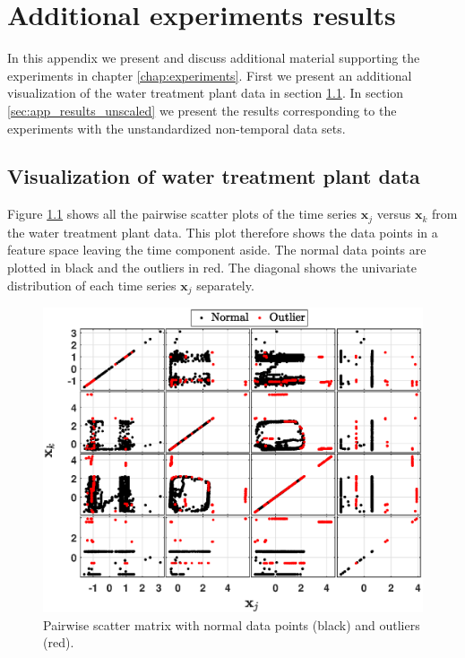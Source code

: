 \chapter{Additional experiments results}
\label{app:experiments}

In this appendix we present and discuss additional material supporting the experiments in chapter \ref{chap:experiments}. First we present an additional visualization of the water treatment plant data in section \ref{sec:app_visualization}. In section \ref{sec:app_results_unscaled} we present the results corresponding to the experiments with the unstandardized non-temporal data sets.

\section{Visualization of water treatment plant data}
\label{sec:app_visualization}

Figure \ref{fig:experiments_swat_scatter} shows all the pairwise scatter plots of the time series $\mathbf{x}_j$ versus $\mathbf{x}_k$ from the water treatment plant data. This plot therefore shows the data points in a feature space leaving the time component aside. The normal data points are plotted in black and the outliers in red. The diagonal shows the univariate distribution of each time series $\mathbf{x}_j$ separately. 

\begin{figure}[h]
	\centering
	\includegraphics[scale=0.65]{experiments/Scattermatrix_swat_timeseries}
	\caption{Pairwise scatter matrix with normal data points (black) and outliers (red).}
	\label{fig:experiments_swat_scatter}
\end{figure}

